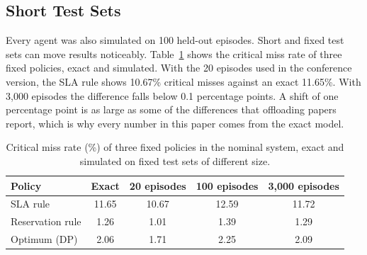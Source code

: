 \subsection{Short Test Sets}
Every agent was also simulated on 100 held-out episodes. Short and fixed test sets can move results noticeably. Table~\ref{tab:protocol} shows the critical miss rate of three fixed policies, exact and simulated. With the 20 episodes used in the conference version, the SLA rule shows 10.67\% critical misses against an exact 11.65\%. With 3,000 episodes the difference falls below 0.1 percentage points. A shift of one percentage point is as large as some of the differences that offloading papers report, which is why every number in this paper comes from the exact model.

\begin{table}[t]
\caption{Critical miss rate (\%) of three fixed policies in the nominal system, exact and simulated on fixed test sets of different size.}
\label{tab:protocol}
\centering
\footnotesize
\setlength{\tabcolsep}{4pt}
\begin{tabular}{@{}lcccc@{}}
\toprule
Policy & Exact & 20 episodes & 100 episodes & 3,000 episodes \\
\midrule
SLA rule & 11.65 & 10.67 & 12.59 & 11.72 \\
Reservation rule & 1.26 & 1.01 & 1.39 & 1.29 \\
Optimum (DP) & 2.06 & 1.71 & 2.25 & 2.09 \\
\bottomrule
\end{tabular}
\end{table}
